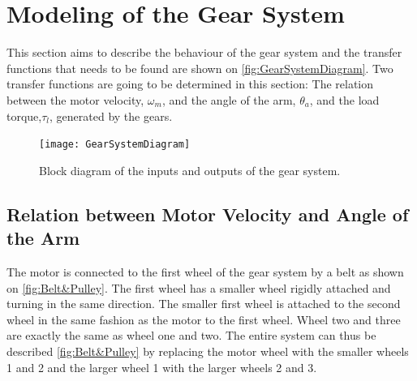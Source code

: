 
\graphicspath{{figures/modeling/gearTrain/}}
\section{Modeling of the Gear System}\label{sec:ModGearSys}
This section aims to describe the behaviour of the gear system and the transfer functions that needs to be found are shown on 
\autoref{fig:GearSystemDiagram}.
Two transfer functions are going to be determined in this section: The relation between the motor velocity, $\omega_m$, and the angle of the arm, $\theta_a$, and the load torque,$\tau_l$, generated by the gears.
\begin{figure}[htbp]
	\centering
	\texttt{[image: GearSystemDiagram]}
	\caption{Block diagram of the inputs and outputs of the gear system.}
	\label{fig:GearSystemDiagram}
\end{figure}

\startexplain
{}
\stopexplain


\subsection{Relation between Motor Velocity and Angle of the Arm}
The motor is connected to the first wheel of the gear system by a belt as shown on \autoref{fig:Belt&Pulley}. The first wheel has a smaller wheel rigidly attached and turning in the same direction. The smaller first wheel is attached to the second wheel in the same fashion as the motor to the first wheel. Wheel two and three are exactly the same as wheel one and two. The entire system can thus be described \autoref{fig:Belt&Pulley} by replacing the motor wheel with the smaller wheels 1 and 2 and the larger wheel 1 with the larger wheels 2 and 3.

